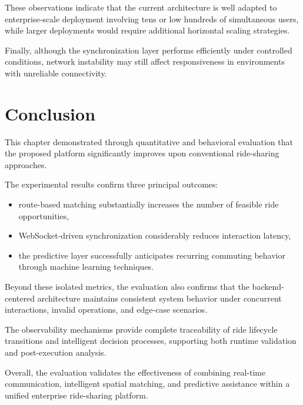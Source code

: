 These observations indicate that the current architecture is well adapted to enterprise-scale deployment involving tens or low hundreds of simultaneous users, while larger deployments would require additional horizontal scaling strategies.

Finally, although the synchronization layer performs efficiently under controlled conditions, network instability may still affect responsiveness in environments with unreliable connectivity.


\section{Conclusion}

This chapter demonstrated through quantitative and behavioral evaluation that the proposed platform significantly improves upon conventional ride-sharing approaches.

The experimental results confirm three principal outcomes:

\begin{itemize}
    \item route-based matching substantially increases the number of feasible ride opportunities,
    
    \item WebSocket-driven synchronization considerably reduces interaction latency,
    
    \item the predictive layer successfully anticipates recurring commuting behavior through machine learning techniques.
\end{itemize}

Beyond these isolated metrics, the evaluation also confirms that the backend-centered architecture maintains consistent system behavior under concurrent interactions, invalid operations, and edge-case scenarios.

The observability mechanisms provide complete traceability of ride lifecycle transitions and intelligent decision processes, supporting both runtime validation and post-execution analysis.

Overall, the evaluation validates the effectiveness of combining real-time communication, intelligent spatial matching, and predictive assistance within a unified enterprise ride-sharing platform.